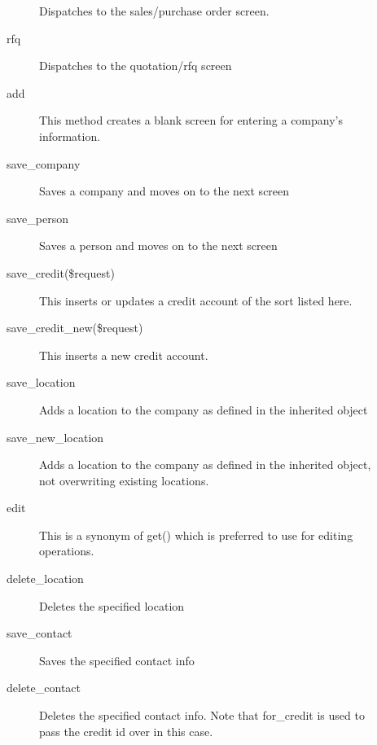\begin{description}
\begin{description}
Dispatches to the sales/purchase order screen.


\item[{rfq}] \mbox{}

Dispatches to the quotation/rfq screen


\item[{add}] \mbox{}

This method creates a blank screen for entering a company's information.


\item[{save\_company}] \mbox{}

Saves a company and moves on to the next screen


\item[{save\_person}] \mbox{}

Saves a person and moves on to the next screen


\item[{save\_credit(\$request)}] \mbox{}

This inserts or updates a credit account of the sort listed here.


\item[{save\_credit\_new(\$request)}] \mbox{}

This inserts a new credit account.


\item[{save\_location}] \mbox{}

Adds a location to the company as defined in the inherited object


\item[{save\_new\_location}] \mbox{}

Adds a location to the company as defined in the inherited object, not
overwriting existing locations.


\item[{edit}] \mbox{}

This is a synonym of get() which is preferred to use for editing operations.


\item[{delete\_location}] \mbox{}

Deletes the specified location


\item[{save\_contact}] \mbox{}

Saves the specified contact info


\item[{delete\_contact}] \mbox{}

Deletes the specified contact info.  Note that for\_credit is used to pass the 
credit id over in this case.



\end{description}
\end{description}

